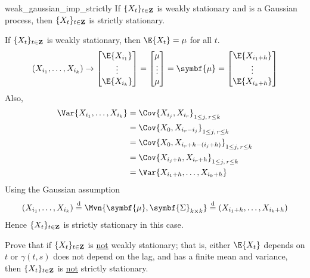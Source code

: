 \begin{Theorem}{}{weak_gaussian_imp_strictly}
    If $ \{X_t\}_{t\in\mathbf{Z}} $ is weakly stationary and is a Gaussian process, then
    $ \{X_t\}_{t\in\mathbf{Z}} $ is strictly stationary.
\end{Theorem}
\begin{Proof}{}{}
    If $ \{X_t\}_{t\in\mathbf{Z}} $ is weakly stationary, then $ \E{X_t}=\mu $ for all $ t $.
    \[ (X_{i_1},\ldots,X_{i_k})\rightarrow
        \begin{bmatrix}
            \E{X_{i_1}} \\
            \vdots      \\
            \E{X_{i_k}}
        \end{bmatrix}=\begin{bmatrix}
            \mu    \\
            \vdots \\
            \mu
        \end{bmatrix}=\symbf{\mu}=
        \begin{bmatrix}
            \E{X_{{i_1}+h}} \\
            \vdots          \\
            \E{X_{{i_k}+h}}
        \end{bmatrix} \]
    Also,
    \begin{align*}
        \Var{X_{i_1},\ldots,X_{i_k}}
         & =\Cov{X_{i_j},X_{i_r}}_{1\le j,\, r\le k}       \\
         & =\Cov{X_0,X_{i_r-i_j}}_{1\le j,\, r\le k}       \\
         & =\Cov{X_0,X_{i_r+h-(i_j+h)}}_{1\le j,\, r\le k} \\
         & =\Cov{X_{i_j+h},X_{i_r+h}}_{1\le j,\, r\le k}   \\
         & =\Var{X_{i_1+h},\ldots,X_{i_k+h}}
    \end{align*}
    Using the Gaussian assumption
    \[ (X_{i_1},\ldots,X_{i_k})
        \stackrel{\text{d}}{=}\Mvn{\symbf{\mu},\symbf{\Sigma}_{k\times k}}
        \stackrel{\text{d}}{=}(X_{i_1+h},\ldots,X_{i_k+h}) \]
    Hence $ \{X_{t}\}_{t\in\mathbf{Z}} $ is strictly stationary
    in this case.
\end{Proof}
\begin{Exercise}{}{}
    Prove that if $ \{X_t\}_{t\in\mathbf{Z}} $ is \underline{not}
    weakly stationary; that is, either $ \E{X_t} $ depends on $ t $
    or $ \gamma(t,s) $ does not depend on the lag, and has
    a finite mean and variance,
    then $ \{X_t\}_{t\in\mathbf{Z}} $ is \underline{not} strictly stationary.
\end{Exercise}

